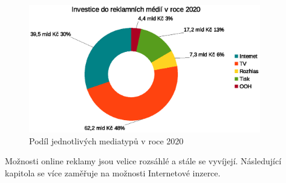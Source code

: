     \begin{figure}[h]
        \centering
        \includegraphics[width=0.9\textwidth]{Figures/pie-chart.eps}

        \caption{Podíl jednotlivých mediatypů v roce 2020 \cite{spir:mediatypes}}
        \label{fig:spir-mediatypes}
    \end{figure}

    Možnosti online reklamy jsou velice rozsáhlé a stále se vyvíjejí. Následující kapitola se více zaměřuje na možnosti Internetové inzerce.